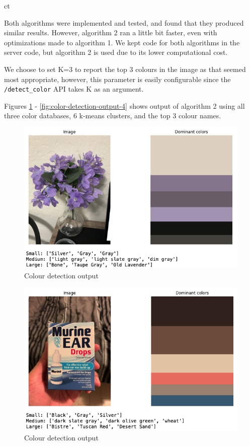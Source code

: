 ct\documentclass[a4paper,11pt]{article}
\begin{document}
Both algorithms were implemented and tested, and found that they produced similar results. However, algorithm 2 ran a little bit faster, even with optimizations made to algorithm 1. We kept code for both algorithms in the server code, but algorithm 2 is used due to its lower computational cost.

We choose to set K=3 to report the top 3 colours in the image as that seemed most appropriate, however, this parameter is easily configurable since the \texttt{/detect\_color} API takes K as an argument.

Figures \ref{fig:color-detection-output-1} - \ref{fig:color-detection-output-4} shows output of algorithm 2 using all three color databases, 6 k-means clusters, and the top 3 colour names.

\begin{figure}[H]
\centering
\includegraphics[scale=0.6]{img/cv/colour_detection/colour_detection_1.png}
\caption{Colour detection output}
\label{fig:color-detection-output-1}
\end{figure}

\begin{figure}[H]
\centering
\includegraphics[scale=0.6]{img/cv/colour_detection/colour_detection_2.png}
\caption{Colour detection output}
\label{fig:color-detection-output-2}
\end{figure}
\end{document}
